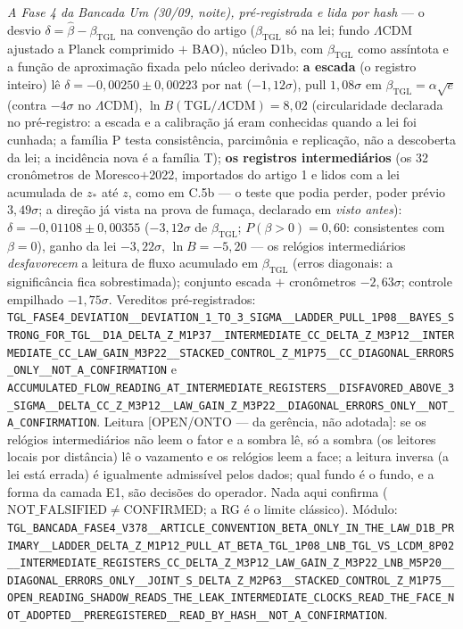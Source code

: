 \documentclass[11pt]{article}
\newcommand{\bTGL}{\beta_{\mathrm{TGL}}}\newcommand{\Msun}{M_{\odot}}\newcommand{\TGL}{\mathrm{TGL}}
\theoremstyle{definition}\newtheorem{deriv}{Derivação}
\begin{document}
\emph{A Fase 4 da Bancada Um (30/09, noite), pré-registrada e lida por hash} --- o desvio $\delta=\hat\beta-\bTGL$ na convenção do artigo ($\bTGL$ só na lei; fundo $\Lambda$CDM ajustado a Planck comprimido $+$ BAO), núcleo D1b, com $\bTGL$ como assíntota e a função de aproximação fixada pelo núcleo derivado: \textbf{a escada} (o registro inteiro) lê $\delta=-0{,}00250\pm0{,}00223$ por nat ($-1{,}12\sigma$), pull $1{,}08\sigma$ em $\bTGL=\alpha\sqrt e$ (contra $-4\sigma$ no $\Lambda$CDM), $\ln B(\mathrm{TGL}/\Lambda\mathrm{CDM})=8{,}02$ (circularidade declarada no pré-registro: a escada e a calibração já eram conhecidas quando a lei foi cunhada; a família P testa consistência, parcimônia e replicação, não a descoberta da lei; a incidência nova é a família T); \textbf{os registros intermediários} (os 32 cronômetros de Moresco$+$2022, importados do artigo 1 e lidos com a lei acumulada de $z_*$ até $z$, como em C.5b --- o teste que podia perder, poder prévio $3{,}49\sigma$; a direção já vista na prova de fumaça, declarado em \emph{visto antes}): $\delta=-0{,}01108\pm0{,}00355$ ($-3{,}12\sigma$ de $\bTGL$; $P(\beta>0)=0{,}60$: consistentes com $\beta=0$), ganho da lei $-3{,}22\sigma$, $\ln B=-5{,}20$ --- os relógios intermediários \emph{desfavorecem} a leitura de fluxo acumulado em $\bTGL$ (erros diagonais: a significância fica sobrestimada); conjunto escada $+$ cronômetros $-2{,}63\sigma$; controle empilhado $-1{,}75\sigma$. Vereditos pré-registrados: \texttt{TGL\_FASE4\_DEVIATION\_\_DEVIATION\_1\_TO\_3\_SIGMA\_\_LADDER\_PULL\_1P08\_\_BAYES\_STRONG\_FOR\_TGL\_\_D1A\_DELTA\_Z\_M1P37\_\_INTERMEDIATE\_CC\_DELTA\_Z\_M3P12\_\_INTERMEDIATE\_CC\_LAW\_GAIN\_M3P22\_\_STACKED\_CONTROL\_Z\_M1P75\_\_CC\_DIAGONAL\_ERRORS\_ONLY\_\_NOT\_A\_CONFIRMATION} e \texttt{ACCUMULATED\_FLOW\_READING\_AT\_INTERMEDIATE\_REGISTERS\_\_DISFAVORED\_ABOVE\_3\_SIGMA\_\_DELTA\_CC\_Z\_M3P12\_\_LAW\_GAIN\_Z\_M3P22\_\_DIAGONAL\_ERRORS\_ONLY\_\_NOT\_A\_CONFIRMATION}. Leitura \textsf{[OPEN/ONTO --- da gerência, não adotada]}: se os relógios intermediários não leem o fator e a sombra lê, só a sombra (os leitores locais por distância) lê o vazamento e os relógios leem a face; a leitura inversa (a lei está errada) é igualmente admissível pelos dados; qual fundo é o fundo, e a forma da camada E1, são decisões do operador. Nada aqui confirma ($\mathrm{NOT\_FALSIFIED}\neq\mathrm{CONFIRMED}$; a RG é o limite clássico). Módulo: \texttt{TGL\_BANCADA\_FASE4\_V378\_\_ARTICLE\_CONVENTION\_BETA\_ONLY\_IN\_THE\_LAW\_D1B\_PRIMARY\_\_LADDER\_DELTA\_Z\_M1P12\_PULL\_AT\_BETA\_TGL\_1P08\_LNB\_TGL\_VS\_LCDM\_8P02\_\_INTERMEDIATE\_REGISTERS\_CC\_DELTA\_Z\_M3P12\_LAW\_GAIN\_Z\_M3P22\_LNB\_M5P20\_\_DIAGONAL\_ERRORS\_ONLY\_\_JOINT\_S\_DELTA\_Z\_M2P63\_\_STACKED\_CONTROL\_Z\_M1P75\_\_OPEN\_READING\_SHADOW\_READS\_THE\_LEAK\_INTERMEDIATE\_CLOCKS\_READ\_THE\_FACE\_NOT\_ADOPTED\_\_PREREGISTERED\_\_READ\_BY\_HASH\_\_NOT\_A\_CONFIRMATION}.
\end{document}
